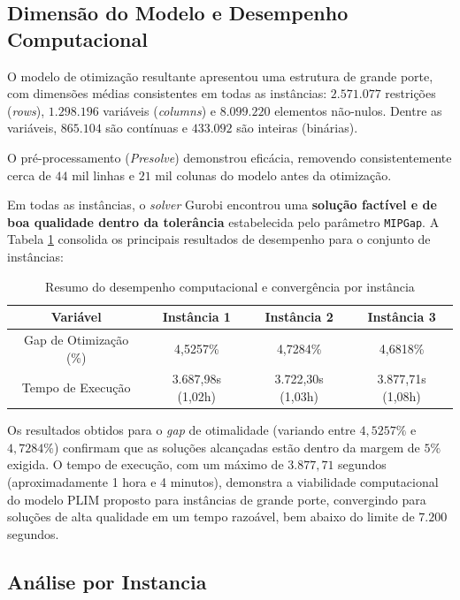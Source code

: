 \subsection{Dimensão do Modelo e Desempenho Computacional}

O modelo de otimização resultante apresentou uma estrutura de grande porte, com dimensões médias consistentes em todas as instâncias: $2.571.077$ restrições (\emph{rows}), $1.298.196$ variáveis (\emph{columns}) e $8.099.220$ elementos não-nulos. Dentre as variáveis, $865.104$ são contínuas e $433.092$ são inteiras (binárias).

O pré-processamento (\emph{Presolve}) demonstrou eficácia, removendo consistentemente cerca de $44$ mil linhas e $21$ mil colunas do modelo antes da otimização.

Em todas as instâncias, o \emph{solver} Gurobi encontrou uma \textbf{solução factível e de boa qualidade dentro da tolerância} estabelecida pelo parâmetro \texttt{MIPGap}. A Tabela \ref{tab:desempenho_resumo} consolida os principais resultados de desempenho para o conjunto de instâncias:

\begin{table}[h!]
\centering
\caption{Resumo do desempenho computacional e convergência por instância}
\label{tab:desempenho_resumo}
\begin{tabular}{|c|c|c|c|}
\hline
\textbf{Variável} & \textbf{Instância 1} & \textbf{Instância 2} & \textbf{Instância 3} \\
\hline
Gap de Otimização (\%) & 4,5257\% & 4,7284\% & 4,6818\% \\
\hline
Tempo de Execução & 3.687,98s (1,02h) & 3.722,30s (1,03h) & 3.877,71s (1,08h) \\
\hline
\end{tabular}
\end{table}

Os resultados obtidos para o \emph{gap} de otimalidade (variando entre $4,5257\%$ e $4,7284\%$) confirmam que as soluções alcançadas estão dentro da margem de $5\%$ exigida. O tempo de execução, com um máximo de $3.877,71$ segundos (aproximadamente 1 hora e 4 minutos), demonstra a viabilidade computacional do modelo PLIM proposto para instâncias de grande porte, convergindo para soluções de alta qualidade em um tempo razoável, bem abaixo do limite de $7.200$ segundos.

\subsection{Análise por Instancia}

